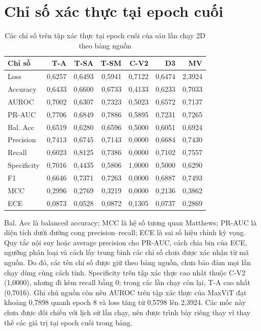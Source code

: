 \documentclass[14pt,a4paper,oneside]{extreport}
\begin{document}
\section{Chỉ số xác thực tại epoch cuối}
\begin{table}[htbp]
  \centering
  \caption{Các chỉ số trên tập xác thực tại epoch cuối của sáu lần chạy 2D theo bảng nguồn}
  \label{tab:sweep-2d-val}
  \setlength{\tabcolsep}{6pt}
  \begin{tabular}{@{}lrrrrrr@{}}
    \toprule
    Chỉ số & T-A & T-SA & T-SM & C-V2 & D3 & MV\\
    \midrule
    Loss & 0,6257 & 0,6493 & 0,5941 & 0,7122 & 0,6474 & 2,3924\\
    Accuracy & 0,6433 & 0,6600 & 0,6733 & 0,4133 & 0,6233 & 0,7033\\
    AUROC & 0,7002 & 0,6307 & 0,7323 & 0,5023 & 0,6572 & 0,7137\\
    PR-AUC & 0,7706 & 0,6849 & 0,7886 & 0,5895 & 0,7231 & 0,7265\\
    Bal. Acc & 0,6519 & 0,6280 & 0,6596 & 0,5000 & 0,6051 & 0,6924\\
    Precision & 0,7413 & 0,6745 & 0,7143 & 0,0000 & 0,6684 & 0,7430\\
    Recall & 0,6023 & 0,8125 & 0,7386 & 0,0000 & 0,7102 & 0,7557\\
    Specificity & 0,7016 & 0,4435 & 0,5806 & 1,0000 & 0,5000 & 0,6290\\
    F1 & 0,6646 & 0,7371 & 0,7263 & 0,0000 & 0,6887 & 0,7493\\
    MCC & 0,2996 & 0,2769 & 0,3219 & 0,0000 & 0,2136 & 0,3862\\
    ECE & 0,0873 & 0,0528 & 0,0872 & 0,1305 & 0,0737 & 0,2869\\
    \bottomrule
  \end{tabular}
\end{table}
Bal. Acc là balanced accuracy; MCC là hệ số tương quan Matthews;
PR-AUC là diện tích dưới đường cong precision--recall; ECE là sai số
hiệu chỉnh kỳ vọng. Quy tắc nội suy hoặc average precision cho PR-AUC,
cách chia bin của ECE, ngưỡng phân loại và cách lấy trung bình các
chỉ số chưa được xác nhận từ mã nguồn. Do đó, các tên chỉ số được
giữ theo bảng nguồn, chưa bảo đảm mọi lần chạy dùng cùng cách tính.
Specificity trên tập xác thực cao nhất thuộc C-V2 (1,0000), nhưng đi kèm
recall bằng 0; trong các lần chạy còn lại, T-A cao nhất (0,7016).
Ghi chú nguồn còn nêu AUROC trên tập xác thực của MaxViT đạt khoảng 0,7898
quanh epoch 8 và loss tăng từ 0,5798 lên 2,3924. Các mốc này chưa
được đối chiếu với lịch sử lần chạy, nên được trình bày riêng thay vì
thay thế các giá trị tại epoch cuối trong bảng.
\FloatBarrier
\end{document}
